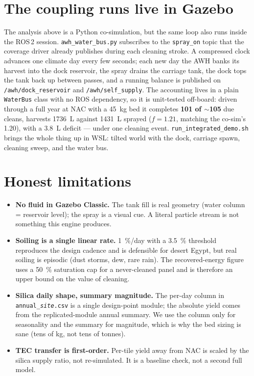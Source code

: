 \documentclass[11pt]{article}
\begin{document}
\section{The coupling runs live in Gazebo}
The analysis above is a Python co-simulation, but the same loop also runs inside
the ROS\,2 session. \texttt{awh\_water\_bus.py} subscribes to the
\texttt{spray\_on} topic that the coverage driver already publishes during each
cleaning stroke. A compressed clock advances one climate day every few seconds;
each new day the AWH banks its harvest into the dock reservoir, the spray drains
the carriage tank, the dock tops the tank back up between passes, and a running
balance is published on \texttt{/awh/dock\_reservoir} and
\texttt{/awh/self\_supply}. The accounting lives in a plain \texttt{WaterBus}
class with no ROS dependency, so it is unit-tested off-board: driven through a
full year at NAC with a \SI{45}{kg} bed it completes \textbf{101 of \(\sim\)105}
due cleans, harvests \SI{1736}{L} against \SI{1431}{L} sprayed
($f=1.21$, matching the co-sim's \num{1.20}), with a \SI{3.8}{L} deficit --- under
one cleaning event. \texttt{run\_integrated\_demo.sh} brings the whole thing up
in WSL: tilted world with the dock, carriage spawn, cleaning sweep, and the
water bus.

\section{Honest limitations}
\begin{itemize}\setlength\itemsep{1pt}
\item \textbf{No fluid in Gazebo Classic.} The tank fill is real geometry (water
column = reservoir level); the spray is a visual cue. A literal particle stream
is not something this engine produces.
\item \textbf{Soiling is a single linear rate.} \SI{1}{\percent/day} with a
\SI{3.5}{\percent} threshold reproduces the design cadence and is defensible for
desert Egypt, but real soiling is episodic (dust storms, dew, rare rain). The
recovered-energy figure uses a \SI{50}{\percent} saturation cap for a
never-cleaned panel and is therefore an upper bound on the value of cleaning.
\item \textbf{Silica daily shape, summary magnitude.} The per-day column in
\texttt{annual\_\textit{site}.csv} is a single design-point module; the absolute
yield comes from the replicated-module annual summary. We use the column only for
seasonality and the summary for magnitude, which is why the bed sizing is sane
(tens of kg, not tens of tonnes).
\item \textbf{TEC transfer is first-order.} Per-tile yield away from NAC is
scaled by the silica supply ratio, not re-simulated. It is a baseline check, not
a second full model.
\end{itemize}
\end{document}
